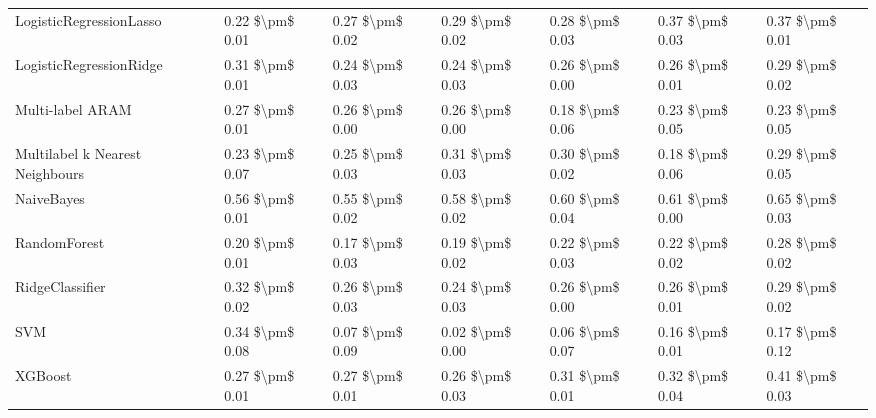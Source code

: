 \begin{tabular}{lllllll}
        LogisticRegressionLasso &     0.22 \$\textbackslash pm\$ 0.01 &           0.27 \$\textbackslash pm\$ 0.02 &       0.29 \$\textbackslash pm\$ 0.02 &        0.28 \$\textbackslash pm\$ 0.03 &                         0.37 \$\textbackslash pm\$ 0.03 & 0.37 \$\textbackslash pm\$ 0.01 \\
        LogisticRegressionRidge &     0.31 \$\textbackslash pm\$ 0.01 &           0.24 \$\textbackslash pm\$ 0.03 &       0.24 \$\textbackslash pm\$ 0.03 &        0.26 \$\textbackslash pm\$ 0.00 &                         0.26 \$\textbackslash pm\$ 0.01 & 0.29 \$\textbackslash pm\$ 0.02 \\
               Multi-label ARAM &     0.27 \$\textbackslash pm\$ 0.01 &           0.26 \$\textbackslash pm\$ 0.00 &       0.26 \$\textbackslash pm\$ 0.00 &        0.18 \$\textbackslash pm\$ 0.06 &                         0.23 \$\textbackslash pm\$ 0.05 & 0.23 \$\textbackslash pm\$ 0.05 \\
Multilabel k Nearest Neighbours &     0.23 \$\textbackslash pm\$ 0.07 &           0.25 \$\textbackslash pm\$ 0.03 &       0.31 \$\textbackslash pm\$ 0.03 &        0.30 \$\textbackslash pm\$ 0.02 &                         0.18 \$\textbackslash pm\$ 0.06 & 0.29 \$\textbackslash pm\$ 0.05 \\
                     NaiveBayes &     0.56 \$\textbackslash pm\$ 0.01 &           0.55 \$\textbackslash pm\$ 0.02 &       0.58 \$\textbackslash pm\$ 0.02 &        0.60 \$\textbackslash pm\$ 0.04 &                         0.61 \$\textbackslash pm\$ 0.00 & 0.65 \$\textbackslash pm\$ 0.03 \\
                   RandomForest &     0.20 \$\textbackslash pm\$ 0.01 &           0.17 \$\textbackslash pm\$ 0.03 &       0.19 \$\textbackslash pm\$ 0.02 &        0.22 \$\textbackslash pm\$ 0.03 &                         0.22 \$\textbackslash pm\$ 0.02 & 0.28 \$\textbackslash pm\$ 0.02 \\
                RidgeClassifier &     0.32 \$\textbackslash pm\$ 0.02 &           0.26 \$\textbackslash pm\$ 0.03 &       0.24 \$\textbackslash pm\$ 0.03 &        0.26 \$\textbackslash pm\$ 0.00 &                         0.26 \$\textbackslash pm\$ 0.01 & 0.29 \$\textbackslash pm\$ 0.02 \\
                            SVM &     0.34 \$\textbackslash pm\$ 0.08 &           0.07 \$\textbackslash pm\$ 0.09 &       0.02 \$\textbackslash pm\$ 0.00 &        0.06 \$\textbackslash pm\$ 0.07 &                         0.16 \$\textbackslash pm\$ 0.01 & 0.17 \$\textbackslash pm\$ 0.12 \\
                        XGBoost &     0.27 \$\textbackslash pm\$ 0.01 &           0.27 \$\textbackslash pm\$ 0.01 &       0.26 \$\textbackslash pm\$ 0.03 &        0.31 \$\textbackslash pm\$ 0.01 &                         0.32 \$\textbackslash pm\$ 0.04 & 0.41 \$\textbackslash pm\$ 0.03 \\
\bottomrule
\end{tabular}
